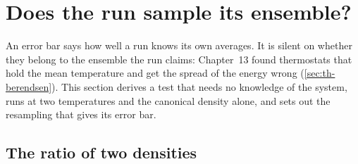 \section{Does the run sample its ensemble?}
\label{sec:cv-ensemble}

An error bar says how well a run knows its own averages. It is silent on
whether they belong to the ensemble the run claims: Chapter~13 found
thermostats
that hold the mean temperature and get the spread of the energy wrong
(\cref{sec:th-berendsen}). This section derives a test that needs no
knowledge of the system, runs at two temperatures and the canonical
density alone\cite{Shirts2013}, and sets out the resampling that gives its
error bar.

\subsection*{The ratio of two densities}

